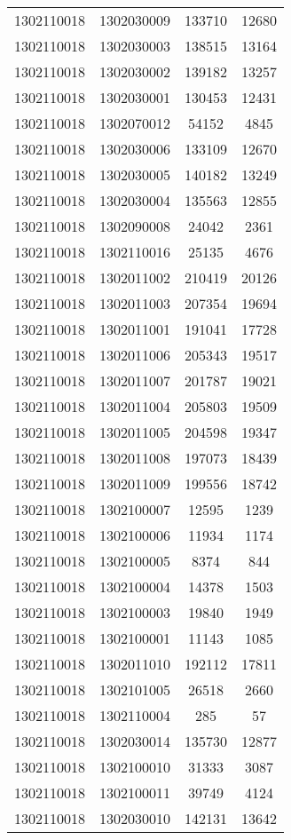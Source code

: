\begin{longtable}{llcc}
1302110018 & 1302030009 & 133710 & 12680\\
1302110018 & 1302030003 & 138515 & 13164\\
1302110018 & 1302030002 & 139182 & 13257\\
1302110018 & 1302030001 & 130453 & 12431\\
1302110018 & 1302070012 & 54152 & 4845\\
1302110018 & 1302030006 & 133109 & 12670\\
1302110018 & 1302030005 & 140182 & 13249\\
1302110018 & 1302030004 & 135563 & 12855\\
1302110018 & 1302090008 & 24042 & 2361\\
1302110018 & 1302110016 & 25135 & 4676\\
1302110018 & 1302011002 & 210419 & 20126\\
1302110018 & 1302011003 & 207354 & 19694\\
1302110018 & 1302011001 & 191041 & 17728\\
1302110018 & 1302011006 & 205343 & 19517\\
1302110018 & 1302011007 & 201787 & 19021\\
1302110018 & 1302011004 & 205803 & 19509\\
1302110018 & 1302011005 & 204598 & 19347\\
1302110018 & 1302011008 & 197073 & 18439\\
1302110018 & 1302011009 & 199556 & 18742\\
1302110018 & 1302100007 & 12595 & 1239\\
1302110018 & 1302100006 & 11934 & 1174\\
1302110018 & 1302100005 & 8374 & 844\\
1302110018 & 1302100004 & 14378 & 1503\\
1302110018 & 1302100003 & 19840 & 1949\\
1302110018 & 1302100001 & 11143 & 1085\\
1302110018 & 1302011010 & 192112 & 17811\\
1302110018 & 1302101005 & 26518 & 2660\\
1302110018 & 1302110004 & 285 & 57\\
1302110018 & 1302030014 & 135730 & 12877\\
1302110018 & 1302100010 & 31333 & 3087\\
1302110018 & 1302100011 & 39749 & 4124\\
1302110018 & 1302030010 & 142131 & 13642\\

\end{longtable}
